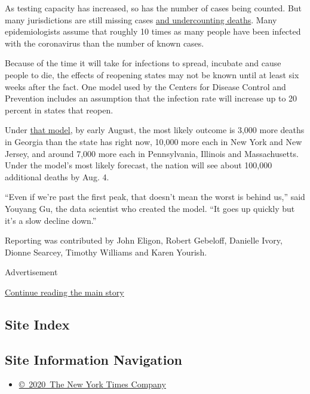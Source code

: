 As testing capacity has increased, so has the number of cases being
counted. But many jurisdictions are still missing cases
\href{https://www.nytimes3xbfgragh.onion/interactive/2020/04/28/us/coronavirus-death-toll-total.html}{and
undercounting deaths}. Many epidemiologists assume that roughly 10 times
as many people have been infected with the coronavirus than the number
of known cases.

Because of the time it will take for infections to spread, incubate and
cause people to die, the effects of reopening states may not be known
until at least six weeks after the fact. One model used by the Centers
for Disease Control and Prevention includes an assumption that the
infection rate will increase up to 20 percent in states that reopen.

Under \href{https://covid19-projections.com/}{that model}, by early
August, the most likely outcome is 3,000 more deaths in Georgia than the
state has right now, 10,000 more each in New York and New Jersey, and
around 7,000 more each in Pennsylvania, Illinois and Massachusetts.
Under the model's most likely forecast, the nation will see about
100,000 additional deaths by Aug. 4.

``Even if we're past the first peak, that doesn't mean the worst is
behind us,'' said Youyang Gu, the data scientist who created the model.
``It goes up quickly but it's a slow decline down.''

Reporting was contributed by John Eligon, Robert Gebeloff, Danielle
Ivory, Dionne Searcey, Timothy Williams and Karen Yourish.

Advertisement

\protect\hyperlink{after-bottom}{Continue reading the main story}

\hypertarget{site-index}{%
\subsection{Site Index}\label{site-index}}

\hypertarget{site-information-navigation}{%
\subsection{Site Information
Navigation}\label{site-information-navigation}}

\begin{itemize}
\tightlist
\item
  \href{https://help.nytimes3xbfgragh.onion/hc/en-us/articles/115014792127-Copyright-notice}{©~2020~The
  New York Times Company}
\end{itemize}

